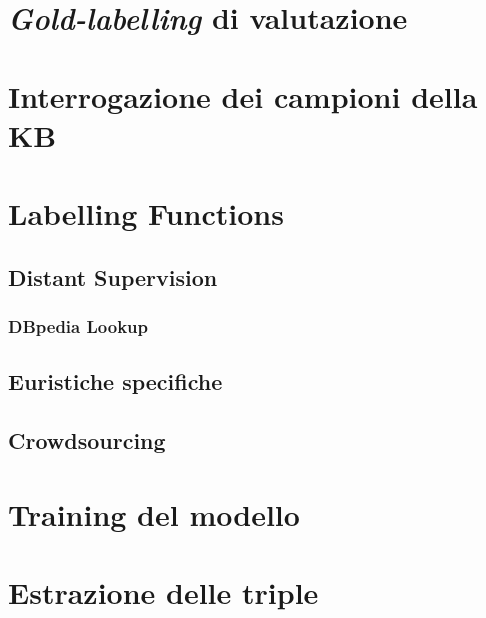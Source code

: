 \section{\textit{Gold-labelling} di valutazione}
\label{sec:methods:gold_labelling}

\section{Interrogazione dei campioni della KB}
\label{sec:methods:kb_quering}



\section{Labelling Functions}
\label{sec:methods:labelling}

\subsection{Distant Supervision}
\label{sec:methods:labelling:distant_supervision}

\subsubsection{DBpedia Lookup}
\label{sec:methods:labelling:distant_supervision:lookup}

\subsection{Euristiche specifiche}
\label{sec:methods:labelling:heuristic}

\subsection{Crowdsourcing}
\label{sec:methods:labelling:crowdsourcing}

\section{Training del modello}
\label{sec:methods:training}

\section{Estrazione delle triple}
\label{sec:methods:triples_extraction}












